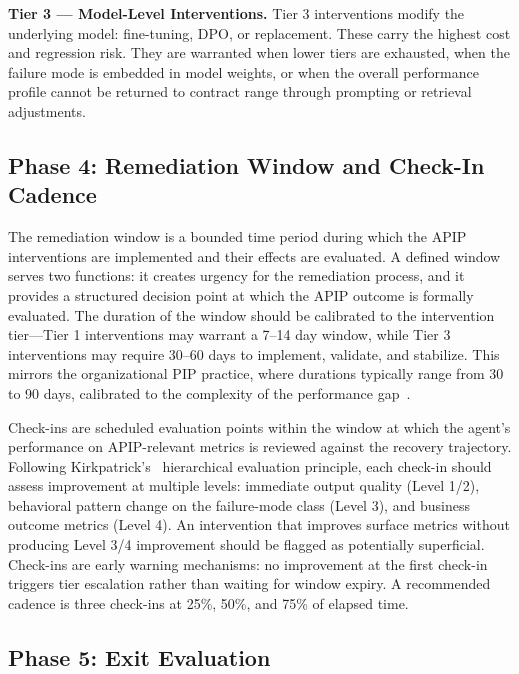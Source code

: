 \documentclass[conference]{IEEEtran}
\begin{document}
\textbf{Tier 3 --- Model-Level Interventions.} Tier 3 interventions modify the
underlying model: fine-tuning, DPO, or replacement. These carry the highest
cost and regression risk. They are warranted when lower tiers are exhausted,
when the failure mode is embedded in model weights, or when the overall
performance profile cannot be returned to contract range through prompting or
retrieval adjustments.

\subsection{Phase 4: Remediation Window and Check-In Cadence}
\label{subsec:window}

The remediation window is a bounded time period during which the APIP
interventions are implemented and their effects are evaluated. A defined window
serves two functions: it creates urgency for the remediation process, and it
provides a structured decision point at which the APIP outcome is formally
evaluated. The duration of the window should be calibrated to the intervention
tier---Tier 1 interventions may warrant a 7--14 day window, while Tier 3
interventions may require 30--60 days to implement, validate, and stabilize.
This mirrors the organizational PIP practice, where durations typically range
from 30 to 90 days, calibrated to the complexity of the performance
gap~\cite{kirkpatrick2016four}.

Check-ins are scheduled evaluation points within the window at which the
agent's performance on APIP-relevant metrics is reviewed against the recovery
trajectory. Following Kirkpatrick's~\cite{kirkpatrick1994evaluating}
hierarchical evaluation principle, each check-in should assess improvement at
multiple levels: immediate output quality (Level 1/2), behavioral pattern
change on the failure-mode class (Level 3), and business outcome metrics
(Level 4). An intervention that improves surface metrics without producing
Level 3/4 improvement should be flagged as potentially superficial. Check-ins
are early warning mechanisms: no improvement at the first check-in triggers
tier escalation rather than waiting for window expiry. A recommended cadence is
three check-ins at 25\%, 50\%, and 75\% of elapsed time.

\subsection{Phase 5: Exit Evaluation}
\label{subsec:exit}
\end{document}
